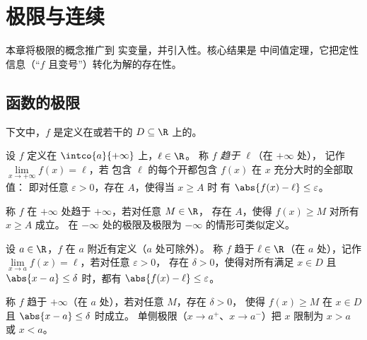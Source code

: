 \chapter{极限与连续}\label{ch:g12:limcont}

本章将极限的概念推广到
实变量，并引入性。核心结果是
中间值定理，它把定性信息（“$f$ 
且变号”）转化为解的存在性。

\section{函数的极限}

下文中，$f$ 是定义在或若干的
$D \subseteq \R$ 上的。

\begin{definition}[无穷远处的极限]\label{def:g12:limcont:liminf}
设 $f$ 定义在 $\intco{a}{+\infty}$ 上，$\ell \in \R$。
称 $f$ \emph{趋于 $\ell$}（在 $+\infty$ 处），
记作 $\lim\limits_{x\to+\infty} f(x) = \ell$，若
包含 $\ell$ 的每个开都包含 $f(x)$ 在 $x$ 充分大时的全部取值：
即对任意 $\varepsilon > 0$，存在 $A$，使得当 $x \geq A$ 时
有 $\abs{f(x) - \ell} \leq \varepsilon$。

称 $f$ 在 $+\infty$ 处趋于 $+\infty$，若对任意 $M \in \R$，
存在 $A$，使得 $f(x) \geq M$ 对所有 $x \geq A$ 成立。
在 $-\infty$ 处的极限及极限为 $-\infty$ 的情形可类似定义。
\end{definition}

\begin{definition}[一点处的极限]\label{def:g12:limcont:limpoint}
设 $a \in \R$，$f$ 在 $a$ 附近有定义（$a$ 处可除外）。
称 $f$ 趋于 $\ell \in \R$（在 $a$ 处），记作
$\lim\limits_{x \to a} f(x) = \ell$，若对任意 $\varepsilon > 0$，
存在 $\delta > 0$，使得对所有满足 $x \in D$ 且
$\abs{x - a} \leq \delta$ 时，都有 $\abs{f(x) - \ell} \leq \varepsilon$。

称 $f$ 趋于 $+\infty$（在 $a$ 处），若对任意 $M$，存在 $\delta > 0$，
使得 $f(x) \geq M$ 在 $x \in D$ 且 $\abs{x - a} \leq \delta$ 时成立。
单侧极限（$x \to a^+$、$x \to a^-$）把 $x$ 限制为 $x > a$
或 $x < a$。
\end{definition}

